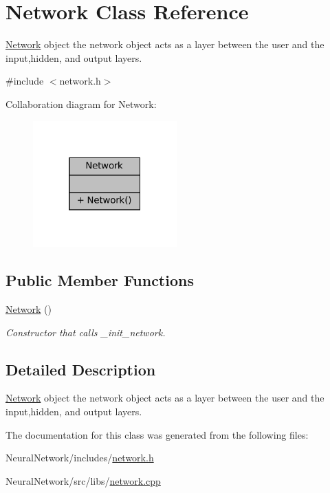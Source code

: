 \hypertarget{classNetwork}{}\section{Network Class Reference}
\label{classNetwork}


\mbox{\hyperlink{classNetwork}{Network}} object the network object acts as a layer between the user and the input,hidden, and output layers.  




{\ttfamily \#include $<$network.\+h$>$}



Collaboration diagram for Network\+:\nopagebreak
\begin{figure}[H]
\begin{center}
\leavevmode
\includegraphics[width=157pt]{classNetwork__coll__graph}
\end{center}
\end{figure}
\subsection*{Public Member Functions}
\begin{DoxyCompactItemize}
\item 
\mbox{\label{classNetwork_a3cc2fb4f8fa4d507077e8da85ce5a1c8}} 
\mbox{\hyperlink{classNetwork_a3cc2fb4f8fa4d507077e8da85ce5a1c8}{Network}} ()
\begin{DoxyCompactList}\small\item\em Constructor that calls \+\_\+init\+\_\+network. \end{DoxyCompactList}\end{DoxyCompactItemize}


\subsection{Detailed Description}
\mbox{\hyperlink{classNetwork}{Network}} object the network object acts as a layer between the user and the input,hidden, and output layers. 

The documentation for this class was generated from the following files\+:\begin{DoxyCompactItemize}
\item 
Neural\+Network/includes/\mbox{\hyperlink{network_8h}{network.\+h}}\item 
Neural\+Network/src/libs/\mbox{\hyperlink{network_8cpp}{network.\+cpp}}\end{DoxyCompactItemize}
